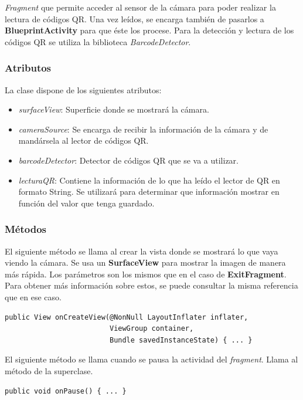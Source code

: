 \documentclass[11pt,a4paper]{article}
\begin{document}
\textit{Fragment} que permite acceder al sensor de la cámara para poder realizar la lectura
de códigos QR. Una vez leídos, se encarga también de pasarlos a \textbf{BlueprintActivity} para que éste los procese.
Para la detección y lectura de los códigos QR se utiliza la biblioteca \textit{BarcodeDetector}.

\subsubsection{Atributos}

La clase dispone de los siguientes atributos:

\begin{itemize}
    \item \textit{surfaceView}: Superficie donde se mostrará la cámara.
    \item \textit{cameraSource}: Se encarga de recibir la información de la cámara y de mandársela al lector de códigos QR.
    \item \textit{barcodeDetector}: Detector de códigos QR que se va a utilizar.
    \item \textit{lecturaQR}: Contiene la información de lo que ha leído el lector de QR en formato String. Se utilizará para
    determinar que información mostrar en función del valor que tenga guardado.
\end{itemize}

\subsubsection{Métodos}

El siguiente método se llama al crear la vista donde se mostrará lo que vaya viendo la cámara. Se usa un \textbf{SurfaceView} para mostrar
la imagen de manera más rápida. Los parámetros son los mismos que en el caso de \textbf{ExitFragment}. Para obtener más información
sobre estos, se puede consultar la misma referencia que en ese caso.

\begin{lstlisting}
public View onCreateView(@NonNull LayoutInflater inflater,
                         ViewGroup container,
                         Bundle savedInstanceState) { ... }
\end{lstlisting}

El siguiente método se llama cuando se pausa la actividad del \textit{fragment}. Llama al método de la superclase.

\begin{lstlisting}
public void onPause() { ... }
\end{lstlisting}
\end{document}
